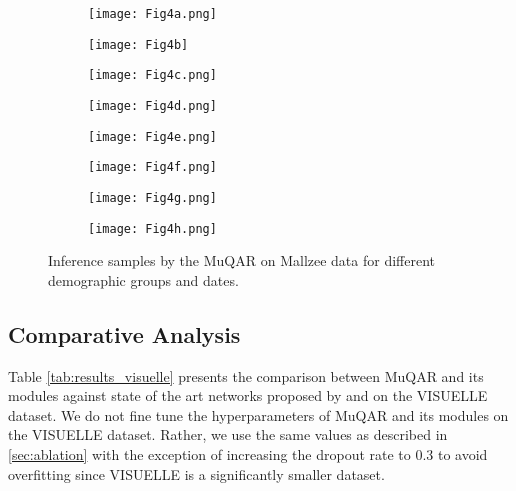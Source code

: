 \documentclass{article}
\begin{document}
\begin{figure*}[]
  \begin{subfigure}[b]{0.5\textwidth}
    \texttt{[image: Fig4a.png]}
    \caption{}
    \label{fig:f1}
  \end{subfigure}
  \hfill
  \begin{subfigure}[b]{0.5\textwidth}
    \texttt{[image: Fig4b]}
    \caption{}
    \label{fig:f2}
  \end{subfigure}
  \hfill
  \begin{subfigure}[b]{0.5\textwidth}
    \texttt{[image: Fig4c.png]}
    \caption{}
    \label{fig:f3}
  \end{subfigure}
  \hfill  
  \begin{subfigure}[b]{0.5\textwidth}
    \texttt{[image: Fig4d.png]}
    \caption{}
    \label{fig:f4}
  \end{subfigure}
  \hfill  
  \begin{subfigure}[b]{0.5\textwidth}
    \texttt{[image: Fig4e.png]}
    \caption{}
    \label{fig:f5}
  \end{subfigure}
  \hfill  
  \begin{subfigure}[b]{0.5\textwidth}
    \texttt{[image: Fig4f.png]}
    \caption{}
    \label{fig:f6}
  \end{subfigure} 
    \begin{subfigure}[b]{0.5\textwidth}
    \texttt{[image: Fig4g.png]}
    \caption{}
    \label{fig:f7}
  \end{subfigure}
  \hfill
  \begin{subfigure}[b]{0.5\textwidth}
    \texttt{[image: Fig4h.png]}
    \caption{}
    \label{fig:f8}
  \end{subfigure}
\caption{Inference samples by the MuQAR on Mallzee data for different demographic groups and dates.}  
\label{fig:inference}
\end{figure*}

\subsection{Comparative Analysis}
\label{section:comparative}

Table \ref{tab:results_visuelle} presents the comparison between MuQAR and its modules against state of the art networks proposed by \cite{ekambaram2020attention} and \cite{skenderi2021well} on the VISUELLE dataset. 
We do not fine tune the hyperparameters of MuQAR and its modules on the VISUELLE dataset. Rather, we use the same values as described in \ref{sec:ablation} with the exception of increasing the dropout rate to 0.3 to avoid overfitting since VISUELLE is a significantly smaller dataset. 
\end{document}
